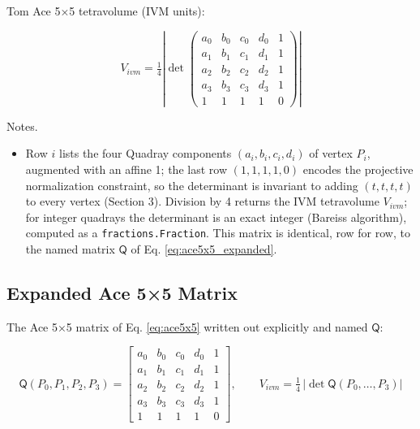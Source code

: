 \documentclass[
  10pt,
]{article}
\newcommand{\passthrough}[1]{#1}
\providecommand{\tightlist}{%
  \setlength{\itemsep}{0pt}\setlength{\parskip}{0pt}}
\begin{document}
Tom Ace 5×5 tetravolume (IVM units):

\begin{equation}\label{eq:ace5x5}
V_{ivm} = \tfrac{1}{4} \left| \det \begin{pmatrix}
 a_0 & b_0 & c_0 & d_0 & 1 \\
 a_1 & b_1 & c_1 & d_1 & 1 \\
 a_2 & b_2 & c_2 & d_2 & 1 \\
 a_3 & b_3 & c_3 & d_3 & 1 \\
  1 & 1 & 1 & 1 & 0
\end{pmatrix} \right|
\end{equation}

Notes.

\begin{itemize}
\tightlist
\item
  Row \(i\) lists the four Quadray components \((a_i, b_i, c_i, d_i)\)
  of vertex \(P_i\), augmented with an affine 1; the last row
  \((1,1,1,1,0)\) encodes the projective normalization constraint, so
  the determinant is invariant to adding \((t,t,t,t)\) to every vertex
  (Section 3). Division by 4 returns the IVM tetravolume \(V_{ivm}\);
  for integer quadrays the determinant is an exact integer (Bareiss
  algorithm), computed as a
  \passthrough{\lstinline!fractions.Fraction!}. This matrix is
  identical, row for row, to the named matrix \(\mathsf{Q}\) of Eq.
  \eqref{eq:ace5x5_expanded}.
\end{itemize}

\subsection{Expanded Ace 5×5 Matrix}\label{expanded-ace-55-matrix}

The Ace 5×5 matrix of Eq. \eqref{eq:ace5x5} written out explicitly and
named \(\mathsf{Q}\):

\begin{equation}\label{eq:ace5x5_expanded}
\mathsf{Q}(P_0,P_1,P_2,P_3) = \begin{bmatrix}
 a_0 & b_0 & c_0 & d_0 & 1 \\
 a_1 & b_1 & c_1 & d_1 & 1 \\
 a_2 & b_2 & c_2 & d_2 & 1 \\
 a_3 & b_3 & c_3 & d_3 & 1 \\
1 & 1 & 1 & 1 & 0
\end{bmatrix}, \qquad V_{ivm} = \tfrac{1}{4}\,\big|\det \mathsf{Q}(P_0,\ldots,P_3)\big|
\end{equation}
\end{document}
